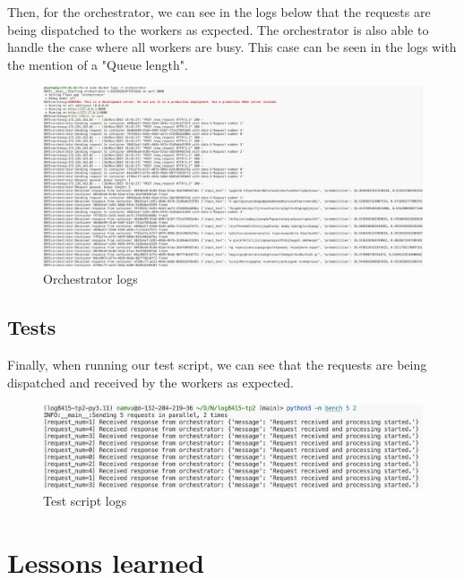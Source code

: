 \documentclass[letterpaper,headings=standardclasses,parskip=half]{scrartcl}
\begin{document}
Then, for the orchestrator, we can see in the logs below that the requests are being dispatched to the workers as expected. The orchestrator is also able to handle the case where all workers are busy. This case can be seen in the logs with the mention of a "Queue length".

\begin{figure}[H]
    \centering
    \includegraphics[width=\textwidth]{images/orchestrator.png}
    \caption{Orchestrator logs}
    \label{fig:orchestrator}
\end{figure}

\subsection{Tests}

Finally, when running our test script, we can see that the requests are being dispatched and received by the workers as expected.

\begin{figure}[H]
    \centering
    \includegraphics[width=\textwidth]{images/test.png}
    \caption{Test script logs}
    \label{fig:test}
\end{figure}

\section{Lessons learned}
\end{document}
